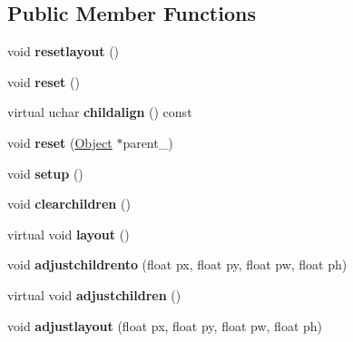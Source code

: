 \subsection*{Public Member Functions}
\begin{DoxyCompactItemize}
\item 
\mbox{\label{struct_u_i_1_1_object_a917e06420d8f89bbf844eac64462f43d}} 
void {\bfseries resetlayout} ()
\item 
\mbox{\label{struct_u_i_1_1_object_a8ef5b0f843b9ac2147ceaab640ec9284}} 
void {\bfseries reset} ()
\item 
\mbox{\label{struct_u_i_1_1_object_ab1873a72004e787542ab9a16bc51a523}} 
virtual uchar {\bfseries childalign} () const
\item 
\mbox{\label{struct_u_i_1_1_object_aab940dc1ed7e25881a2f4240cd054972}} 
void {\bfseries reset} (\hyperlink{struct_u_i_1_1_object}{Object} $\ast$parent\+\_\+)
\item 
\mbox{\label{struct_u_i_1_1_object_a833b462011ff45c68979f2b1f5797896}} 
void {\bfseries setup} ()
\item 
\mbox{\label{struct_u_i_1_1_object_a10fd1c2b82082f7787fbc315169b1df6}} 
void {\bfseries clearchildren} ()
\item 
\mbox{\label{struct_u_i_1_1_object_a409c328693af58a5956da4c15a48bd83}} 
virtual void {\bfseries layout} ()
\item 
\mbox{\label{struct_u_i_1_1_object_a1edd43efc6cb6520c5983e6250cbd659}} 
void {\bfseries adjustchildrento} (float px, float py, float pw, float ph)
\item 
\mbox{\label{struct_u_i_1_1_object_aacf31701430ce6dad6417ed36fb7d2d8}} 
virtual void {\bfseries adjustchildren} ()
\item 
\mbox{\label{struct_u_i_1_1_object_af803ddb92770d3443ef48ab17eb7cce6}} 
void {\bfseries adjustlayout} (float px, float py, float pw, float ph)

\end{DoxyCompactItemize}
